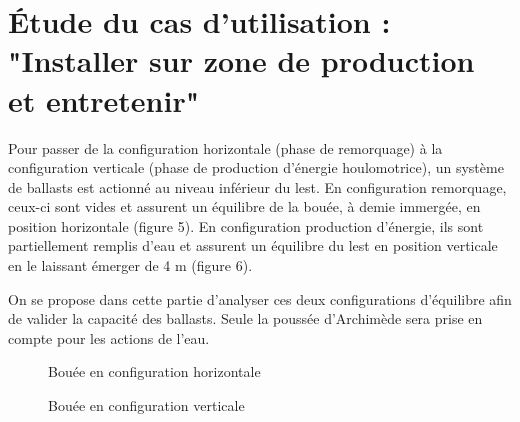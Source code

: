 \section{Étude du cas d'utilisation : "Installer sur zone de production et entretenir"}

Pour passer de la configuration horizontale (phase de remorquage) à la configuration verticale (phase de production d'énergie houlomotrice), un système de ballasts est actionné au niveau inférieur du lest. En configuration remorquage, ceux-ci sont vides et assurent un équilibre de la bouée, à demie immergée, en position horizontale (figure 5). En configuration production
d'énergie, ils sont partiellement remplis d'eau et assurent un équilibre du lest en position verticale en le laissant émerger de 4 m (figure 6).

On se propose dans cette partie d'analyser ces deux configurations d'équilibre afin de valider la capacité des ballasts. Seule la poussée d'Archimède sera prise en compte pour les actions de l'eau.

\begin{figure}[ht!]
\begin{center}
  \def\svgwidth{0.8\linewidth}
  
 \end{center}
  \caption{Bouée en configuration horizontale}
\label{fig05}
\end{figure}

\begin{figure}
	\vspace{-0.8cm}
\begin{center}
  \def\svgwidth{0.7\linewidth}
  
 \end{center}
  \caption{Bouée en configuration verticale}
\label{fig06}
\end{figure}

